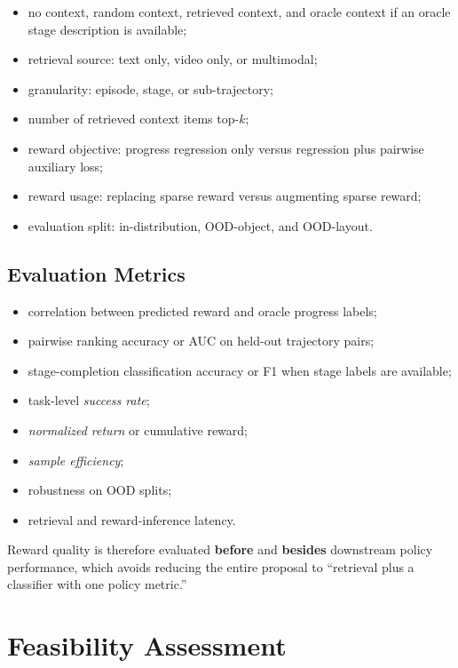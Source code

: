 \begin{itemize}
  \item no context, random context, retrieved context, and oracle context if an oracle stage description is available;
  \item retrieval source: text only, video only, or multimodal;
  \item granularity: episode, stage, or sub-trajectory;
  \item number of retrieved context items top-$k$;
  \item reward objective: progress regression only versus regression plus pairwise auxiliary loss;
  \item reward usage: replacing sparse reward versus augmenting sparse reward;
  \item evaluation split: in-distribution, OOD-object, and OOD-layout.
\end{itemize}

\subsection{Evaluation Metrics}

\begin{itemize}
  \item correlation between predicted reward and oracle progress labels;
  \item pairwise ranking accuracy or AUC on held-out trajectory pairs;
  \item stage-completion classification accuracy or F1 when stage labels are available;
  \item task-level \textit{success rate};
  \item \textit{normalized return} or cumulative reward;
  \item \textit{sample efficiency};
  \item robustness on OOD splits;
  \item retrieval and reward-inference latency.
\end{itemize}

Reward quality is therefore evaluated \textbf{before} and \textbf{besides} downstream policy performance,
which avoids reducing the entire proposal to ``retrieval plus a classifier with one policy metric.''

\section{Feasibility Assessment}

